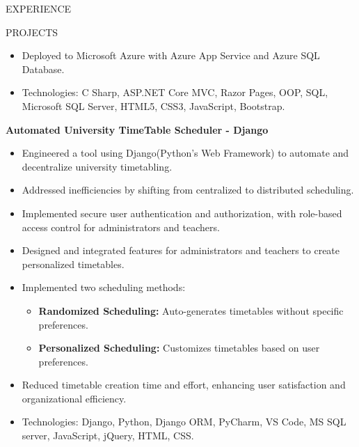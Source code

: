 \documentclass{resume} %
\begin{document}
\begin{rSection}{EXPERIENCE}
\begin{rSection}{PROJECTS}
\begin{itemize}
	\item Deployed to Microsoft Azure with Azure App Service and Azure SQL Database.
	\item Technologies: C Sharp, ASP.NET Core MVC, Razor Pages, OOP, SQL, Microsoft SQL Server, HTML5, CSS3, JavaScript, Bootstrap.
\end{itemize}



\item \textbf{Automated University TimeTable Scheduler - Django}

\iffalse


 {Built a tool to easify the hectic and stressfull process of organization timetabling. Problem needed to solve was to make the process distributed instead of the current centralised timetable scheduling process. Keeping provided features for admin and teachers to solve the problem and create personalized timetables. Implemented two ways to get the final scheduled timetable, i.e. Randomised and personalized timetables}
 
\fi
 
 \begin{itemize}
 	\item Engineered a tool using Django(Python's Web Framework) to automate and decentralize university timetabling.
 	\item Addressed inefficiencies by shifting from centralized to distributed scheduling.
 	\item Implemented secure user authentication and authorization, with role-based access control for administrators and teachers.
 	\item Designed and integrated features for administrators and teachers to create personalized timetables.
 	\item Implemented two scheduling methods:
 	\begin{itemize}
 		\item \textbf{Randomized Scheduling:} Auto-generates timetables without specific preferences.
 		\item \textbf{Personalized Scheduling:} Customizes timetables based on user preferences.
 	\end{itemize}
 	\item Reduced timetable creation time and effort, enhancing user satisfaction and organizational efficiency.
 	\item Technologies: Django, Python, Django ORM, PyCharm, VS Code, MS SQL server, JavaScript, jQuery, HTML, CSS.
 \end{itemize}

\end{rSection} 
\end{rSection} 
\end{document}
